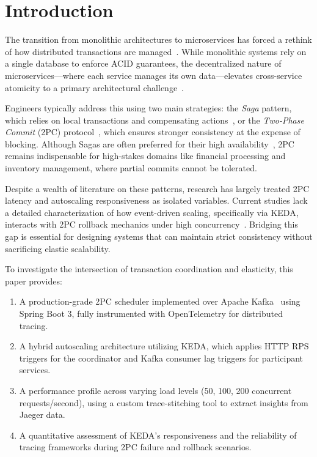 \maketitle

\section{Introduction}
\label{sec:introduction}

The transition from monolithic architectures to microservices has forced a rethink of how distributed transactions are managed~\cite{newman2021building}. 
%
While monolithic systems rely on a single database to enforce ACID guarantees, the decentralized nature of microservices—where each service manages its own data—elevates cross-service atomicity to a primary architectural challenge~\cite{larrucea2018microservices}.

Engineers typically address this using two main strategies: the \emph{Saga} pattern, which relies on local transactions and compensating actions~\cite{garcia1987sagas}, or the \emph{Two-Phase Commit} (2PC) protocol~\cite{gray1978notes}, which ensures stronger consistency at the expense of blocking. 
%
Although Sagas are often preferred for their high availability~\cite{helland2007life}, 2PC remains indispensable for high-stakes domains like financial processing and inventory management, where partial commits cannot be tolerated.

Despite a wealth of literature on these patterns, research has largely treated 2PC latency and autoscaling responsiveness as isolated variables. 
%
Current studies lack a detailed characterization of how event-driven scaling, specifically via KEDA, interacts with 2PC rollback mechanics under high concurrency~\cite{aral2018quality}. 
%
Bridging this gap is essential for designing systems that can maintain strict consistency without sacrificing elastic scalability.

To investigate the intersection of transaction coordination and elasticity, this paper provides:
\begin{enumerate}
  \item A production-grade 2PC scheduler implemented over Apache Kafka~\cite{kafka2011} using Spring Boot 3, fully instrumented with OpenTelemetry for distributed tracing.
  \item A hybrid autoscaling architecture utilizing KEDA, which applies HTTP RPS triggers for the coordinator and Kafka consumer lag triggers for participant services.
  \item A performance profile across varying load levels ({50, 100, 200} concurrent requests/second), using a custom trace-stitching tool to extract insights from Jaeger data.
  \item A quantitative assessment of KEDA's responsiveness and the reliability of tracing frameworks during 2PC failure and rollback scenarios.
\end{enumerate}

